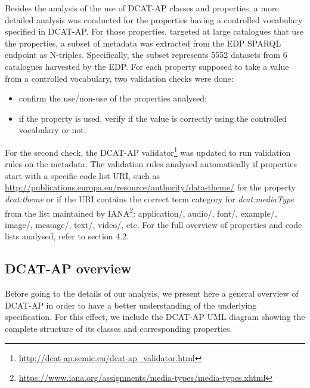 \documentclass[<options>]{elsarticle}
\begin{document}
Besides the analysis of the use of DCAT-AP classes and properties, a more detailed analysis was conducted for the properties having a controlled vocabulary specified in DCAT-AP. For those properties, targeted at large catalogues that use the properties, a subset of metadata was extracted from the EDP SPARQL endpoint as N-triples. Specifically, the subset represents 5552 datasets from 6 catalogues harvested by the EDP. For each property supposed to take a value from a controlled vocabulary, two validation checks were done:

\begin{itemize}
\item confirm the use/non-use of the properties analysed;
\item if the property is used, verify if the value is correctly using the controlled vocabulary or not.
\end{itemize}

For the second check, the DCAT-AP validator\footnote{\href{ http://dcat-ap.semic.eu/dcat-ap_validator.html}{ http://dcat-ap.semic.eu/dcat-ap\_validator.html}} was updated to run validation rules on the metadata. The validation rules analysed automatically if properties start with a specific code list URI, such as \url{http://publications.europa.eu/resource/authority/data-theme/} for the property \textit{dcat:theme} or if the URI contains the correct term category for \textit{dcat:mediaType} from the list maintained by IANA\footnote{\href{  https://www.iana.org/assignments/media-types/media-types.xhtml}{https://www.iana.org/assignments/media-types/media-types.xhtml}}: application/, audio/, font/, example/, image/, message/, text/, video/, etc.  For the full overview of properties and code lists analysed, refer to section 4.2. 
% 
% 
% 

\subsection{DCAT-AP overview}

Before going to the details of our analysis, we present here a general overview of DCAT-AP in order to have a better understanding of the underlying specification. For this effect, we include the DCAT-AP UML diagram showing the complete structure of its classes and corresponding properties.
\end{document}
